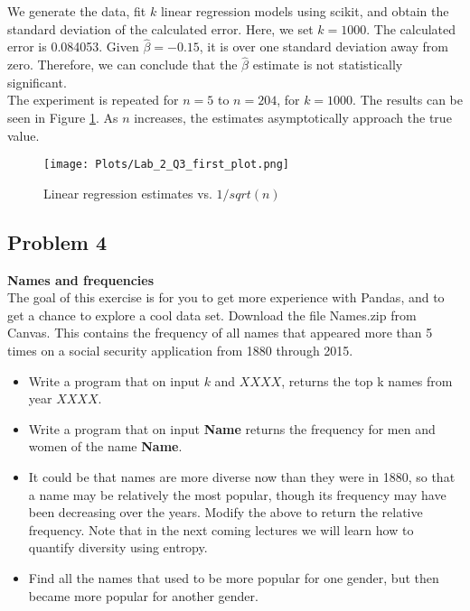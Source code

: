 \documentclass[12pt]{article}%
\begin{document}
We generate the data, fit $k$ linear regression models using scikit, and obtain the standard deviation of the calculated error. Here, we set $k = 1000$. The calculated error is 0.084053. Given $\hat{\beta} = -0.15$, it is over one standard deviation away from zero. Therefore, we can conclude that the $\hat{\beta}$ estimate is not statistically significant.\\

The experiment is repeated for $n=5$ to $n = 204$, for $k = 1000$. The results can be seen in Figure \ref{fig:Q3_plot}. As $n$ increases, the estimates asymptotically approach the true value.

\begin{figure}
\texttt{[image: Plots/Lab\_2\_Q3\_first\_plot.png]}
\centering
\caption{Linear regression estimates vs. $1/sqrt(n)$}
\label{fig:Q3_plot}
\centering
\end{figure}





\subsection{Problem 4}

\textbf{Names and frequencies}\\

The goal of this exercise is for you to get more experience with Pandas, and to get a chance to explore a cool data set. Download the file Names.zip from Canvas. This contains the frequency of all names that appeared more than 5 times on a social security application from 1880 through 2015.

\begin{itemize}
    \item Write a program that on input $k$ and $XXXX$, returns the top k names from year $XXXX$.
    \item Write a program that on input \textbf{Name} returns the frequency for men and women of the name \textbf{Name}.
    \item It could be that names are more diverse now than they were in 1880, so that a name may be relatively the most popular, though its frequency may have been decreasing over the years. Modify the above to return the relative frequency. Note that in the next coming lectures we will learn how to quantify diversity using entropy.
    \item Find all the names that used to be more popular for one gender, but then became more popular for another gender.
\end{itemize}
\end{document}
